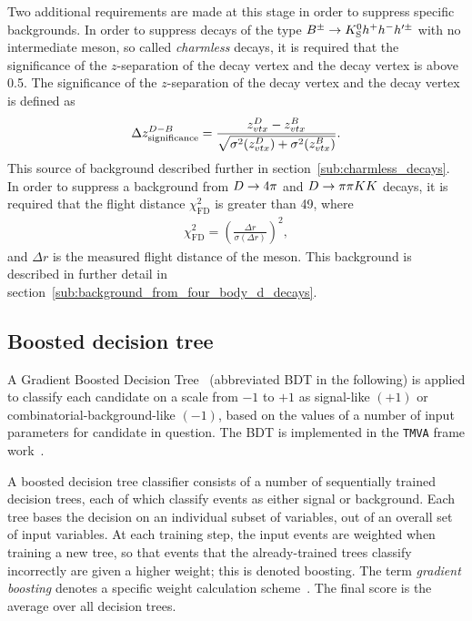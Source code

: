 Two additional requirements are made at this stage in order to suppress specific backgrounds.
In order to suppress decays of the type ${{B}^\pm} \rightarrow {\ensuremath{{K}^0_{\mathrm{S}}}} h^+h^- h'^\pm$ with no intermediate \D meson, so called \emph{charmless} decays, it is required that the significance of the $z$-separation of the \Dz decay vertex and the \Bpm decay vertex is above 0.5. The significance of the $z$-separation of the \Dz decay vertex and the \Bpm decay vertex is defined as
\begin{align}\label{eg:Dz_sig_def}
    \Delta z^{D-B}_{\text{significance}}=\frac{z_{vtx}^{D}-z_{vtx}^{B}}{\sqrt{\sigma^2(z_{vtx}^{D})+\sigma^2(z_{vtx}^{B})}}.
\end{align} This source of background described further in section~\ref{sub:charmless_decays}. In order to suppress a background from ${D}\rightarrow4\pi$ and ${D}\rightarrow\pi\pi{\ensuremath{K}}{\ensuremath{K}}$ decays,  it is required that the \KS flight distance $\chi^2_\text{FD}$ is greater than 49, where
\begin{align}\label{eq:fdchisq_def}
    \chi^2_\text{FD} = \left(\frac{\Delta r}{\sigma(\Delta r)}\right)^2,
\end{align} and $\Delta r$ is the measured flight distance of the \KS meson. This background is described in further detail in section~\ref{sub:background_from_four_body_d_decays}. 




\subsection{Boosted decision tree} %
\label{sub:boosted_decision_tree}

A Gradient Boosted Decision Tree~\cite{Breiman} (abbreviated BDT in the following) is applied to classify each candidate on a scale from $-1$ to $+1$ as signal-like $(+1)$ or combinatorial-background-like $(-1)$, based on the values of a number of input parameters for candidate in question. The BDT is implemented in the \texttt{TMVA} frame work~\cite{Hocker:2007ht,TMVA4}.

A boosted decision tree classifier consists of a number of sequentially trained decision trees, each of which classify events as either signal or background. Each tree bases the decision on an individual subset of variables, out of an overall set of input variables. At each training step, the input events are weighted when training a new tree, so that events that the already-trained trees classify incorrectly are given a higher weight; this is denoted boosting. The term \emph{gradient boosting} denotes a specific weight calculation scheme~\cite{TMVA4}. The final score is the average over all decision trees.

